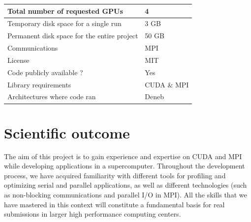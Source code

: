 \documentclass[11pt,a4paper]{article}
\begin{document}
\begin{center}
\begin{tabular}{| l | l |}
	\hline
	Total number of requested GPUs & 4\\
	\hline
	Temporary disk space for a single run & 3 GB \\
	\hline
	Permanent disk space for the entire project & 50 GB \\
	\hline
	Communications & MPI \\
	\hline
	License & MIT \\
	\hline
	Code publicly available ? & Yes \\
	\hline
	Library requirements & CUDA $\&$ MPI \\
	\hline
	Architectures where code ran & Deneb  \\
	\hline
\end{tabular}
\end{center}

\vspace{-0.3cm}
\section{Scientific outcome}
\vspace{-0.1cm}
The aim of this project is to gain experience and expertise on CUDA and MPI while developing applications in a supercomputer.
Throughout the development process, we have acquired familiarity with different tools for profiling and optimizing serial and parallel applications, as well as different technologies (such as non-blocking communications and parallel I/O in MPI).
All the skills that we have mastered in this context will constitute a fundamental basis for real submissions in larger high performance computing centers.
\end{document}
